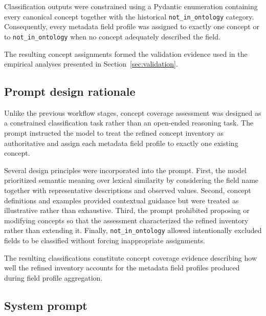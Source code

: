 \documentclass{article}
\begin{document}
Classification outputs were constrained using a Pydantic enumeration containing every canonical concept together with the historical \texttt{not\_in\_ontology} category. Consequently, every metadata field profile was assigned to exactly one concept or to \texttt{not\_in\_ontology} when no concept adequately described the field.

The resulting concept assignments formed the validation evidence used in the empirical analyses presented in Section~\ref{sec:validation}.

\subsection{Prompt design rationale}

Unlike the previous workflow stages, concept coverage assessment was designed as a constrained classification task rather than an open-ended reasoning task. The prompt instructed the model to treat the refined concept inventory as authoritative and assign each metadata field profile to exactly one existing concept.

Several design principles were incorporated into the prompt. First, the model prioritized semantic meaning over lexical similarity by considering the field name together with representative descriptions and observed values. Second, concept definitions and examples provided contextual guidance but were treated as illustrative rather than exhaustive. Third, the prompt prohibited proposing or modifying concepts so that the assessment characterized the refined inventory rather than extending it. Finally, \texttt{not\_in\_ontology} allowed intentionally excluded fields to be classified without forcing inappropriate assignments.

The resulting classifications constitute concept coverage evidence describing how well the refined inventory accounts for the metadata field profiles produced during field profile aggregation.

\subsection{System prompt}
\end{document}

